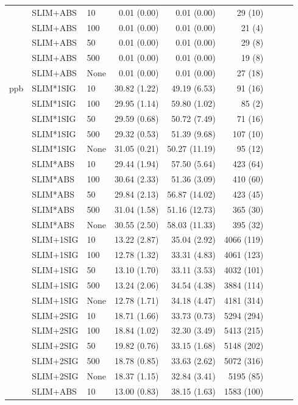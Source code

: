 \begin{longtable}{lllrrrrrr}
 & SLIM+ABS & 10 & 0.01 (0.00) & 0.01 (0.00) & 29 (10) \\
 & SLIM+ABS & 100 & 0.01 (0.00) & 0.01 (0.00) & 21 (4) \\
 & SLIM+ABS & 50 & 0.01 (0.00) & 0.01 (0.00) & 29 (8) \\
 & SLIM+ABS & 500 & 0.01 (0.00) & 0.01 (0.00) & 19 (8) \\
 & SLIM+ABS & None & 0.01 (0.00) & 0.01 (0.00) & 27 (18) \\
\midrule
ppb & SLIM*1SIG & 10 & 30.82 (1.22) & 49.19 (6.53) & 91 (16) \\
 & SLIM*1SIG & 100 & 29.95 (1.14) & 59.80 (1.02) & 85 (2) \\
 & SLIM*1SIG & 50 & 29.59 (0.68) & 50.72 (7.49) & 71 (16) \\
 & SLIM*1SIG & 500 & 29.32 (0.53) & 51.39 (9.68) & 107 (10) \\
 & SLIM*1SIG & None & 31.05 (0.21) & 50.27 (11.19) & 95 (12) \\
 & SLIM*ABS & 10 & 29.44 (1.94) & 57.50 (5.64) & 423 (64) \\
 & SLIM*ABS & 100 & 30.64 (2.33) & 51.36 (3.09) & 410 (60) \\
 & SLIM*ABS & 50 & 29.84 (2.13) & 56.87 (14.02) & 423 (45) \\
 & SLIM*ABS & 500 & 31.04 (1.58) & 51.16 (12.73) & 365 (30) \\
 & SLIM*ABS & None & 30.55 (2.50) & 58.03 (11.33) & 395 (32) \\
 & SLIM+1SIG & 10 & 13.22 (2.87) & 35.04 (2.92) & 4066 (119) \\
 & SLIM+1SIG & 100 & 12.78 (1.32) & 33.31 (4.83) & 4061 (123) \\
 & SLIM+1SIG & 50 & 13.10 (1.70) & 33.11 (3.53) & 4032 (101) \\
 & SLIM+1SIG & 500 & 13.24 (2.06) & 34.54 (4.38) & 3884 (114) \\
 & SLIM+1SIG & None & 12.78 (1.71) & 34.18 (4.47) & 4181 (314) \\
 & SLIM+2SIG & 10 & 18.71 (1.66) & 33.73 (0.73) & 5294 (294) \\
 & SLIM+2SIG & 100 & 18.84 (1.02) & 32.30 (3.49) & 5413 (215) \\
 & SLIM+2SIG & 50 & 19.82 (0.76) & 33.15 (1.68) & 5148 (202) \\
 & SLIM+2SIG & 500 & 18.78 (0.85) & 33.63 (2.62) & 5072 (316) \\
 & SLIM+2SIG & None & 18.37 (1.15) & 32.84 (3.41) & 5195 (85) \\
 & SLIM+ABS & 10 & 13.00 (0.83) & 38.15 (1.63) & 1583 (100) \\

\end{longtable}
